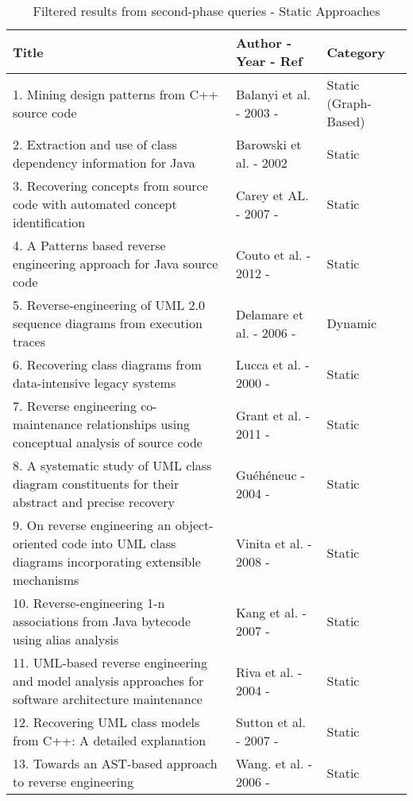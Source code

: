 \begin{table}[ht]
\caption{Filtered results from second-phase queries - Static Approaches}
\label{table:relatedPapers}
\centering
\begin{tabularx}{\textwidth}{X|X|l}
\toprule
\rowcolor[HTML]{BBDAFF}
\textbf{Title}  & \textbf{Author - Year - Ref} & \textbf{Category} \\ \hline
1. Mining design patterns from C++ source code & Balanyi et al. - 2003 - \cite{Balanyi2003} &  Static (Graph-Based)
\\ \hline
2. Extraction and use of class dependency information for Java & Barowski et al. - 2002 \cite{Barowski} & Static 
\\ \hline
3. Recovering concepts from source code with automated concept identification & Carey et AL. - 2007 - \cite{recoveringconcepts} &  Static
\\ \hline
4. A Patterns based reverse engineering approach for Java source code & Couto et al. - 2012 - \cite{Couto2012} & Static
\\ \hline
5. Reverse-engineering of UML 2.0 sequence diagrams from execution traces & Delamare et al. - 2006 - \cite{Delamare06} &  Dynamic
\\ \hline
6. Recovering class diagrams from data-intensive legacy systems & Lucca et al.  - 2000 - \citep{Lucca2000}  &  Static
\\ \hline
7. Reverse engineering co-maintenance relationships using conceptual analysis of source code & Grant et al. - 2011 - \cite{grant2011reverse} & Static
\\ \hline
8. A systematic study of UML class diagram constituents for their abstract and precise recovery & Guéhéneuc - 2004 - \cite{GueheneucSystematic} & Static
\\ \hline
9. On reverse engineering an object-oriented code into UML class diagrams incorporating extensible mechanisms & Vinita et al. - 2008 - \cite{Vinita2008} & Static
\\ \hline 
10. Reverse-engineering 1-n associations from Java bytecode using alias analysis & Kang et al. - 2007 - \cite{Kang2007} & Static
\\ \hline
11. UML-based reverse engineering and model analysis approaches for software architecture maintenance & Riva et al. - 2004 - \cite{1357789} & Static
\\ \hline
12. Recovering UML class models from C++: A detailed explanation & Sutton et al. - 2007 -  \cite{Sutton2007} & Static
\\ \hline
13. Towards an AST-based approach to reverse engineering & Wang. et al. - 2006 - \cite{4054609} & Static
\\ \hline
\end{tabularx}
\end{table}

